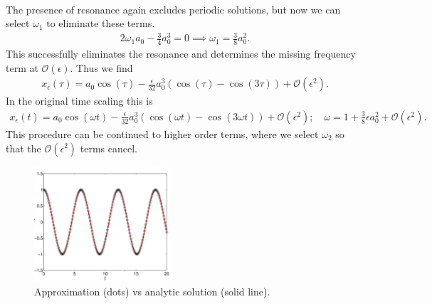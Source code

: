 \begin{ex}
\begin{align}
\end{align}
The presence of resonance again excludes periodic solutions, but now we can select $\omega_1$ to eliminate these terms.
\begin{align}
	2\omega_1 a_0 - \frac{3}{4} a_0 ^{3} = 0 \implies \boxed{\omega_1 = \frac{3}{8}a_0^{2}.}
\end{align}
This successfully eliminates the resonance and determines the missing frequency term at $\mathcal{O}(\epsilon)$. Thus we find
\begin{align}
	x_\epsilon(\tau) = a_0 \cos(\tau) - \frac{\epsilon}{32}a_0^{3}\left( \cos(\tau) - \cos (3\tau) \right) + \mathcal{O}(\epsilon^2).
\end{align}
In the original time scaling this is
\begin{align}
	x_\epsilon (t) = a_0 \cos (\omega t) - \frac{\epsilon}{32} a_0^3 \left( \cos(\omega t) - \cos(3\omega t)\right) + \mathcal{O}(\epsilon^2); \quad \omega = 1+ \frac{3}{8}\epsilon a_0^2 + \mathcal{O}(\epsilon^2).	
\end{align}
This procedure can be continued to higher order terms, where we select $\omega_2$ so that the $\mathcal{O}(\epsilon^2)$ terms cancel.
\begin{figure}[h]
	\centering
	\includegraphics[width=0.45\textwidth]{figures/ch1/19approximation_accuracy.png}
	\caption{Approximation (dots) vs analytic solution (solid line).}
\end{figure}

\end{ex}
